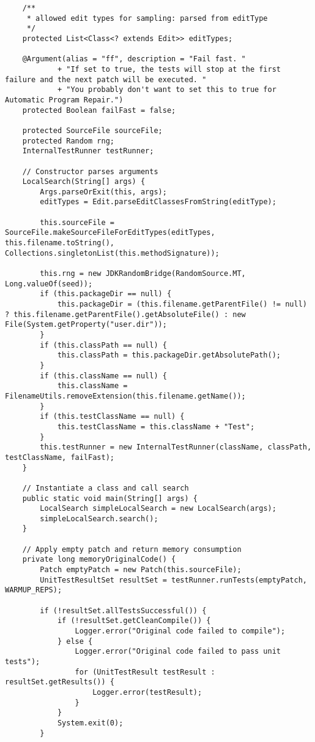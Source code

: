 \begin{lstlisting}
    /**
     * allowed edit types for sampling: parsed from editType
     */
    protected List<Class<? extends Edit>> editTypes;

    @Argument(alias = "ff", description = "Fail fast. "
            + "If set to true, the tests will stop at the first failure and the next patch will be executed. "
            + "You probably don't want to set this to true for Automatic Program Repair.")
    protected Boolean failFast = false;

    protected SourceFile sourceFile;
    protected Random rng;
    InternalTestRunner testRunner;

    // Constructor parses arguments
    LocalSearch(String[] args) {
        Args.parseOrExit(this, args);
        editTypes = Edit.parseEditClassesFromString(editType);

        this.sourceFile = SourceFile.makeSourceFileForEditTypes(editTypes, this.filename.toString(), Collections.singletonList(this.methodSignature));

        this.rng = new JDKRandomBridge(RandomSource.MT, Long.valueOf(seed));
        if (this.packageDir == null) {
            this.packageDir = (this.filename.getParentFile() != null) ? this.filename.getParentFile().getAbsoluteFile() : new File(System.getProperty("user.dir"));
        }
        if (this.classPath == null) {
            this.classPath = this.packageDir.getAbsolutePath();
        }
        if (this.className == null) {
            this.className = FilenameUtils.removeExtension(this.filename.getName());
        }
        if (this.testClassName == null) {
            this.testClassName = this.className + "Test";
        }
        this.testRunner = new InternalTestRunner(className, classPath, testClassName, failFast);
    }

    // Instantiate a class and call search
    public static void main(String[] args) {
        LocalSearch simpleLocalSearch = new LocalSearch(args);
        simpleLocalSearch.search();
    }

    // Apply empty patch and return memory consumption
    private long memoryOriginalCode() {
        Patch emptyPatch = new Patch(this.sourceFile);
        UnitTestResultSet resultSet = testRunner.runTests(emptyPatch, WARMUP_REPS);

        if (!resultSet.allTestsSuccessful()) {
            if (!resultSet.getCleanCompile()) {
                Logger.error("Original code failed to compile");
            } else {
                Logger.error("Original code failed to pass unit tests");
                for (UnitTestResult testResult : resultSet.getResults()) {
                    Logger.error(testResult);
                }
            }
            System.exit(0);
        }


\end{lstlisting}
